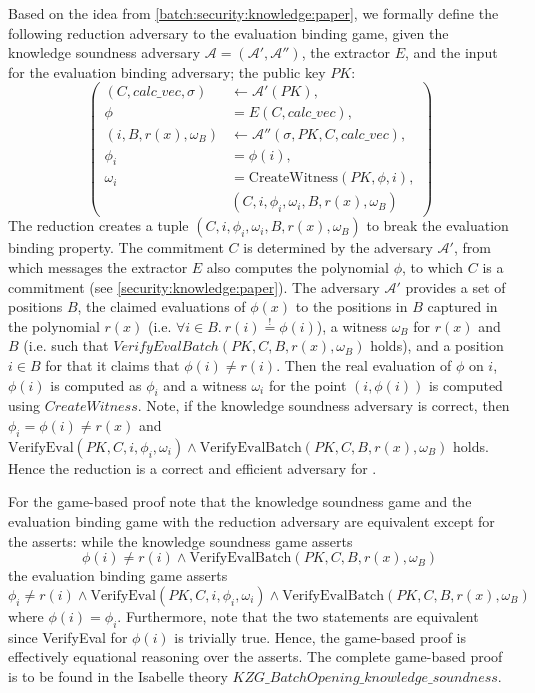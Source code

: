 Based on the idea from \ref{batch:security:knowledge:paper}, we formally define the following reduction adversary to the evaluation binding game, given the knowledge soundness adversary $\mathcal{A=(A',A'')}$, the extractor $E$, and the input for the evaluation binding adversary; the public key $PK$:
\begin{equation*}
    \left(
        \begin{aligned}
            (C,calc\_vec, \sigma) &\leftarrow \mathcal{A'}(PK), \\
            \phi &= E(C, calc\_vec),\\
            (i, B, r(x), \omega_B) &\leftarrow \mathcal{A''}(\sigma, PK, C, calc\_vec), \\
            \phi_i &= \phi(i), \\
            \omega_i &= \text{CreateWitness}(PK,\phi, i), \\
            &  (C, i, \phi_i, \omega_i, B, r(x), \omega_B)
        \end{aligned}
        \right)
\end{equation*}
The reduction creates a tuple $(C, i, \phi_i, \omega_i, B, r(x), \omega_B)$ to break the evaluation binding property. The commitment $C$ is determined by the adversary $\mathcal{A'}$, from which messages the extractor $E$ also computes the polynomial $\phi$, to which $C$ is a commitment (see \ref{security:knowledge:paper}). The adversary $\mathcal{A'}$ provides a set of positions $B$, the claimed evaluations of $\phi(x)$ to the positions in $B$ captured in the polynomial $r(x)$ (i.e. $\forall i\in B.\ r(i)\stackrel{!}{=}\phi(i)$), a witness $\omega_B$ for $r(x)$ and $B$ (i.e. such that $VerifyEvalBatch(PK,C,B,r(x), \omega_B)$ holds), and a position $i \in B$ for that it claims that $\phi(i) \ne r(i)$. Then the real evaluation of $\phi$ on $i$, $\phi(i)$ is computed as $\phi_i$ and a witness $\omega_i$ for the point $(i,\phi(i))$ is computed using $CreateWitness$.
Note, if the knowledge soundness adversary is correct, then $\phi_i=\phi(i)\ne r(x)$ and $\text{VerifyEval}(PK,C,i,\phi_i,\omega_i) \land \text{VerifyEvalBatch}(PK,C,B, r(x),\omega_B)$ holds. Hence the reduction is a correct and efficient adversary for .

For the game-based proof note that the knowledge soundness game and the evaluation binding game with the reduction adversary are equivalent except for the asserts: while the knowledge soundness game asserts 
$$\phi(i) \ne r(i) \land \text{VerifyEvalBatch}(PK, C, B,r(x),\omega_B)$$ the evaluation binding game asserts 
$$\phi_i \ne r(i) \land \text{VerifyEval}(PK, C, i, \phi_i, \omega_i) \land \text{VerifyEvalBatch}(PK, C, B, r(x), \omega_B)$$ where $\phi(i)=\phi_i$. Furthermore, note that the two statements are equivalent since VerifyEval for $\phi(i)$ is trivially true. Hence, the game-based proof is effectively equational reasoning over the asserts. The complete game-based proof is to be found in the Isabelle theory $KZG\_BatchOpening\_knowledge\_soundness$.

